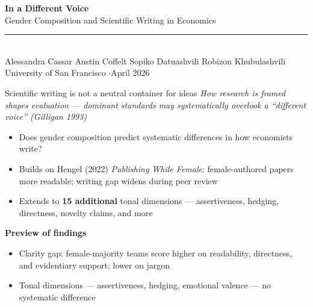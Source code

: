 \documentclass[aspectratio=169,11pt]{beamer}
\begin{document}

\begin{frame}[plain]
    \vfill
    \centering
    {\huge\bfseries\color{DeepNavy} In a Different Voice}\\[0.4cm]
    {\large\color{WarmGray} Gender Composition and Scientific Writing in Economics}\\[0.8cm]
    \textcolor{LightGray}{\rule{0.5\textwidth}{0.4pt}}\\[0.5cm]
    {\normalsize\color{DeepNavy}
        Alessandra Cassar \quad Austin Coffelt \quad
        Sopiko Datuashvili \quad Robizon Khubulashvili}\\[0.2cm]
    {\small\color{WarmGray} University of San Francisco \quad$\cdot$\quad April 2026}
    \vfill
\end{frame}

\begin{frame}{Scientific writing is not a neutral container for ideas}
    \vfill
    \RaggedRight
    {\normalsize\color{WarmGray}\textit{How research is framed shapes evaluation --- dominant standards may systematically overlook a ``different voice'' (Gilligan 1993)}}
    \vspace{0.25cm}

    {\normalsize
    \begin{itemize}\setlength\itemsep{0.18cm}
        \item Does gender composition predict systematic differences in how economists write?
        \item Builds on Hengel (2022) \textit{Publishing While Female}: female-authored papers more readable; writing gap widens during peer review
        \item Extends to \textbf{15 additional} tonal dimensions --- assertiveness, hedging, directness, novelty claims, and more
    \end{itemize}
    }
    \vspace{0.22cm}
    {\small\bfseries\color{Teal} Preview of findings}\\[0.1cm]
    {\normalsize
    \begin{itemize}\setlength\itemsep{0.15cm}
        \item Clarity gap: female-majority teams score higher on readability, directness, and evidentiary support; lower on jargon
        \item Tonal dimensions --- assertiveness, hedging, emotional valence --- no systematic difference
    \end{itemize}
    }
    \vfill
\end{frame}
\end{document}
